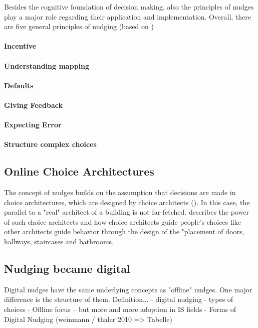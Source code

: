 Besides the cognitive foundation of decision making, also the principles of nudges play a major role regarding their application and implementation. Overall, there are five general principles of nudging (based on \cite{thaler_choice_2010})
\paragraph{Incentive}
\paragraph{Understanding mapping}
\paragraph{Defaults}
\paragraph{Giving Feedback}
\paragraph{Expecting Error}
\paragraph{Structure complex choices}




\subsection{Online Choice Architectures}
The concept of nudges builds on the assumption that decisions are made in choice architectures, which are designed by choice architects (\cite{thaler_nudge:_2009}). In this case, the parallel to a "real" architect of a building is not far-fetched. \cite{johnson_beyond_2012} describes the power of such choice architects and how choice architects guide people's choices like other architects guide behavior through the design of the "placement of doors, hallways, staircases and bathrooms.

\subsection{Nudging became digital}
Digital nudges have the same underlying concepts as "offline" nudges. One major difference is the structure of them. 
Definition...
- digital nudging
- types of choices
- Offline focus – but more and more adoption in IS fields
- Forms of Digital Nudging (weinmann / thaler 2010 => Tabelle)


